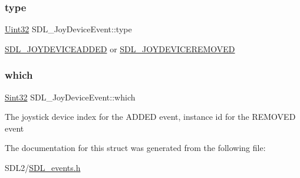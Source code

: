 \mbox{\label{struct_s_d_l___joy_device_event_a51f060ba1dd5669b458e9c97aece667e}} 
\subsubsection{\texorpdfstring{type}{type}}
{\footnotesize\ttfamily \hyperlink{_s_d_l__stdinc_8h_add440eff171ea5f55cb00c4a9ab8672d}{Uint32} S\+D\+L\+\_\+\+Joy\+Device\+Event\+::type}

\hyperlink{_s_d_l__events_8h_a3b589e89be6b35c02e0dd34a55f3fccaa0500c4e830a1822e6d0a90294c3f1393}{S\+D\+L\+\_\+\+J\+O\+Y\+D\+E\+V\+I\+C\+E\+A\+D\+D\+ED} or \hyperlink{_s_d_l__events_8h_a3b589e89be6b35c02e0dd34a55f3fccaa4e2d7a1067dc56abeee393d46309ecd0}{S\+D\+L\+\_\+\+J\+O\+Y\+D\+E\+V\+I\+C\+E\+R\+E\+M\+O\+V\+ED} \mbox{\label{struct_s_d_l___joy_device_event_af9b295798f033b799ebbda7de6cb5a7e}} 
\subsubsection{\texorpdfstring{which}{which}}
{\footnotesize\ttfamily \hyperlink{_s_d_l__stdinc_8h_a7a90b941db9d4582e9ad7abb9940ff7e}{Sint32} S\+D\+L\+\_\+\+Joy\+Device\+Event\+::which}

The joystick device index for the A\+D\+D\+ED event, instance id for the R\+E\+M\+O\+V\+ED event 

The documentation for this struct was generated from the following file\+:\begin{DoxyCompactItemize}
\item 
S\+D\+L2/\hyperlink{_s_d_l__events_8h}{S\+D\+L\+\_\+events.\+h}\end{DoxyCompactItemize}
